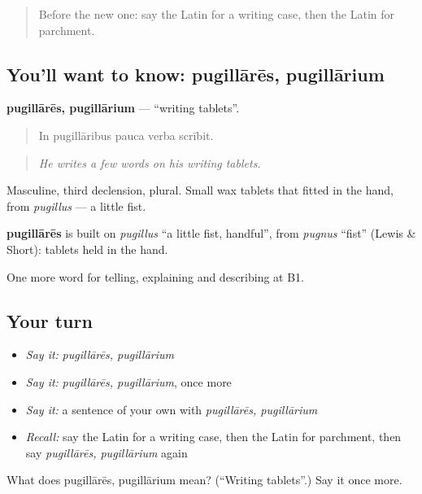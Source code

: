 \begin{quote}
Before the new one: say the Latin for a writing case, then the Latin for parchment.
\end{quote}

\subsection*{You'll want to know: pugillārēs, pugillārium}
\textbf{pugillārēs, pugillārium} — \textquotedblleft{}writing tablets\textquotedblright{}.

\begin{quote}
In pugillāribus pauca verba scrībit.
\end{quote}

\begin{quote}
\emph{He writes a few words on his writing tablets.}
\end{quote}

Masculine, third declension, plural. Small wax tablets that fitted in the hand, from \emph{pugillus} — a little fist.

\begin{cousinweb}
\textbf{pugillārēs} is built on \emph{pugillus} \textquotedblleft{}a little fist, handful\textquotedblright{}, from \emph{pugnus} \textquotedblleft{}fist\textquotedblright{} (Lewis \& Short): tablets held in the hand.
\end{cousinweb}

\begin{grammarlens}[title={What you've built}]
One more word for telling, explaining and describing at B1.
\end{grammarlens}

\subsection*{Your turn}
\begin{itemize}
\raggedright
  \item \emph{Say it:} \emph{pugillārēs, pugillārium}
  \item \emph{Say it:} \emph{pugillārēs, pugillārium}, once more
  \item \emph{Say it:} a sentence of your own with \emph{pugillārēs, pugillārium}
  \item \emph{Recall:} say the Latin for a writing case, then the Latin for parchment, then say \emph{pugillārēs, pugillārium} again
\end{itemize}

\begin{tcolorbox}[breakable,colback=teal!4,colframe=teal!35!black,title={Before you move on}]
What does pugillārēs, pugillārium mean? (\textquotedblleft{}Writing tablets\textquotedblright{}.) Say it once more.
\end{tcolorbox}
